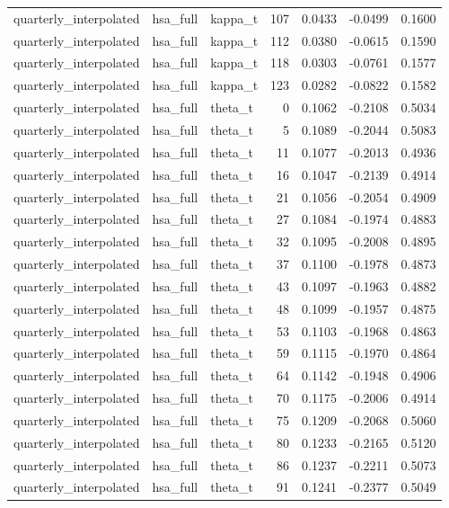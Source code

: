 \begin{tabular}{lllrrrr}
quarterly\_interpolated & hsa\_full & kappa\_t & 107 & 0.0433 & -0.0499 & 0.1600 \\
quarterly\_interpolated & hsa\_full & kappa\_t & 112 & 0.0380 & -0.0615 & 0.1590 \\
quarterly\_interpolated & hsa\_full & kappa\_t & 118 & 0.0303 & -0.0761 & 0.1577 \\
quarterly\_interpolated & hsa\_full & kappa\_t & 123 & 0.0282 & -0.0822 & 0.1582 \\
quarterly\_interpolated & hsa\_full & theta\_t & 0 & 0.1062 & -0.2108 & 0.5034 \\
quarterly\_interpolated & hsa\_full & theta\_t & 5 & 0.1089 & -0.2044 & 0.5083 \\
quarterly\_interpolated & hsa\_full & theta\_t & 11 & 0.1077 & -0.2013 & 0.4936 \\
quarterly\_interpolated & hsa\_full & theta\_t & 16 & 0.1047 & -0.2139 & 0.4914 \\
quarterly\_interpolated & hsa\_full & theta\_t & 21 & 0.1056 & -0.2054 & 0.4909 \\
quarterly\_interpolated & hsa\_full & theta\_t & 27 & 0.1084 & -0.1974 & 0.4883 \\
quarterly\_interpolated & hsa\_full & theta\_t & 32 & 0.1095 & -0.2008 & 0.4895 \\
quarterly\_interpolated & hsa\_full & theta\_t & 37 & 0.1100 & -0.1978 & 0.4873 \\
quarterly\_interpolated & hsa\_full & theta\_t & 43 & 0.1097 & -0.1963 & 0.4882 \\
quarterly\_interpolated & hsa\_full & theta\_t & 48 & 0.1099 & -0.1957 & 0.4875 \\
quarterly\_interpolated & hsa\_full & theta\_t & 53 & 0.1103 & -0.1968 & 0.4863 \\
quarterly\_interpolated & hsa\_full & theta\_t & 59 & 0.1115 & -0.1970 & 0.4864 \\
quarterly\_interpolated & hsa\_full & theta\_t & 64 & 0.1142 & -0.1948 & 0.4906 \\
quarterly\_interpolated & hsa\_full & theta\_t & 70 & 0.1175 & -0.2006 & 0.4914 \\
quarterly\_interpolated & hsa\_full & theta\_t & 75 & 0.1209 & -0.2068 & 0.5060 \\
quarterly\_interpolated & hsa\_full & theta\_t & 80 & 0.1233 & -0.2165 & 0.5120 \\
quarterly\_interpolated & hsa\_full & theta\_t & 86 & 0.1237 & -0.2211 & 0.5073 \\
quarterly\_interpolated & hsa\_full & theta\_t & 91 & 0.1241 & -0.2377 & 0.5049 \\

\end{tabular}
